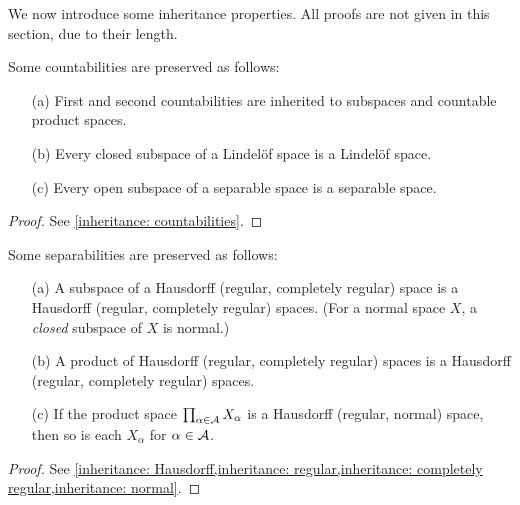 We now introduce some inheritance properties.
All proofs are not given in this section, due to their length.
\begin{prop}\label{inheritance of countabilities}
    Some countabilities are preserved as follows:
    \begin{enumerate}
        \item[(a)]
        {
            First and second countabilities are inherited to subspaces and countable product spaces.
        }
        \item[(b)]
        {
            Every closed subspace of a Lindel\"{o}f space is a Lindel\"{o}f space.
        }
        \item[(c)]
        {
            Every open subspace of a separable space is a separable space.
        }
    \end{enumerate}
\end{prop}
\begin{proof}
    See \cref{inheritance: countabilities}.
\end{proof}

\begin{prop}\label{inheritance of separabilities}
    Some separabilities are preserved as follows:
    \begin{enumerate}
        \item[(a)]
        {
            A subspace of a Hausdorff (regular, completely regular) space is a Hausdorff (regular, completely regular) spaces.
            (For a normal space $X$, a \textit{closed} subspace of $X$ is normal.)
        }
        \item[(b)]
        {
            A product of Hausdorff (regular, completely regular) spaces is a Hausdorff (regular, completely regular) spaces.
        }
        \item[(c)]
        {
            If the product space $\prod_{\alpha\in {\mathcal{A}}} X_\alpha$ is a Hausdorff (regular, normal) space, then so is each $X_\alpha$ for $\alpha\in {\mathcal{A}}$.
        }
    \end{enumerate}
\end{prop}
\begin{proof}
    See \cref{inheritance: Hausdorff,inheritance: regular,inheritance: completely regular,inheritance: normal}.
\end{proof}

